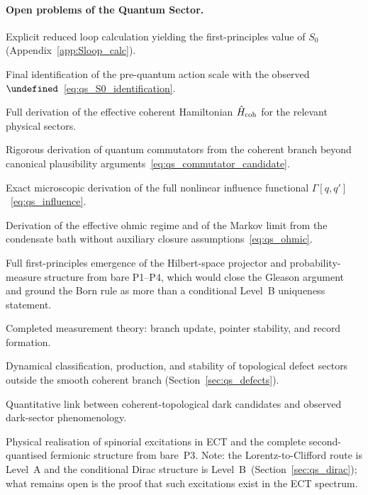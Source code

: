 \documentclass[11pt,a4paper]{article}
\let\hbar\undefined
\numberwithin{equation}{section}
\begin{document}
\paragraph{Open problems of the Quantum Sector.}
\begin{description}[leftmargin=2.2em]
  \item[OP-Q1] Explicit reduced loop calculation yielding the
    first-principles value of $S_0$
    (Appendix~\ref{app:Sloop_calc}).
  \item[OP-Q2] Final identification of the pre-quantum action scale
    with the observed $\hbar$~\eqref{eq:qs_S0_identification}.
  \item[OP-Q3] Full derivation of the effective coherent Hamiltonian
    $\hat H_{\rm coh}$ for the relevant physical sectors.
  \item[OP-Q4] Rigorous derivation of quantum commutators from the
    coherent branch beyond canonical plausibility
    arguments~\eqref{eq:qs_commutator_candidate}.
  \item[OP-Q5] Exact microscopic derivation of the full nonlinear
    influence functional $\Gamma[q,q']$~\eqref{eq:qs_influence}.
  \item[OP-Q6] Derivation of the effective ohmic regime and of the
    Markov limit from the condensate bath without auxiliary closure
    assumptions~\eqref{eq:qs_ohmic}.
  \item[OP-Q7] Full first-principles emergence of the Hilbert-space
    projector and probability-measure structure from bare P1--P4,
    which would close the Gleason argument and ground the Born rule
    as more than a conditional Level~B uniqueness statement.
  \item[OP-Q8] Completed measurement theory: branch update, pointer
    stability, and record formation.
  \item[OP-Q9] Dynamical classification, production, and stability of
    topological defect sectors outside the smooth coherent branch
    (Section~\ref{sec:qs_defects}).
  \item[OP-Q10] Quantitative link between coherent-topological dark
    candidates and observed dark-sector phenomenology.
  \item[OP-Q11] Physical realisation of spinorial excitations in ECT
    and the complete second-quantised fermionic structure from bare~P3.
    Note: the Lorentz-to-Clifford route is Level~A and the conditional
    Dirac structure is Level~B~(Section~\ref{sec:qs_dirac});
    what remains open is the proof that such excitations exist in
    the ECT spectrum.

\end{description}
\end{document}
